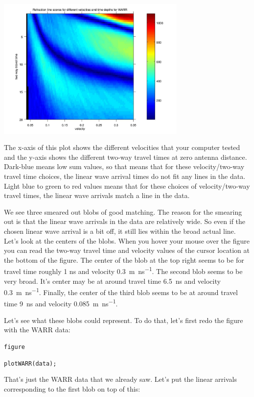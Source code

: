 \documentclass[11pt]{article}
\begin{document}
\begin{center}
\includegraphics[width=0.7\textwidth, trim = 1cm 0cm 1cm
  0cm,clip]{figures/WARRlinSemblance.jpg}
\end{center}
The x-axis of this plot shows the different velocities that your
computer tested and the y-axis shows the different two-way travel
times at zero antenna distance. Dark-blue means low sum values, so
that means that for these velocity/two-way travel time choices, the
linear wave arrival times do not fit any lines in the data. Light blue to
green to red values means that for these choices of velocity/two-way
travel times, the linear wave arrivals match a line in the data.

We see three smeared out blobs of good matching. The reason for the
smearing out is that the linear wave arrivals in the data are
relatively wide. So even if the chosen linear wave arrival is a bit
off, it still lies within the broad actual line. Let's
look at the centers of the blobs. When you hover your mouse over the
figure you can read the two-way travel time and velocity values of the
cursor location at the bottom of the figure. The center of the blob at
the top right seems to be for travel time roughly 1 ns and velocity
\SI{0.3}{m\per\ns}. The second blob seems to be very broad. It's
center may be at around travel time \SI{6.5}{\ns} and velocity
\SI{0.3}{m\per\ns}. Finally, the center of the third blob seems to be
at around travel time \SI{9}{\ns} and velocity \SI{0.085}{m\per\ns}.
 
Let's see what these blobs could represent. To do that, let's first
redo the figure with the WARR data:

\qquad \verb#figure#

\qquad \verb#plotWARR(data);#

That's just the WARR data that we already saw. Let's put the
linear arrivals corresponding to the first blob on top of this:
 
\end{document}
